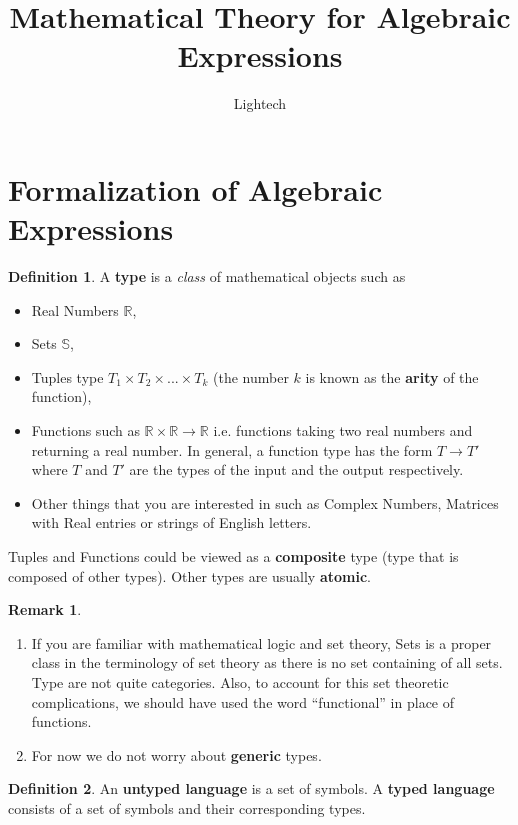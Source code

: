 \documentclass{amsart}
\title{Mathematical Theory for Algebraic Expressions}
\author{Lightech}
\theoremstyle{definition}
\newtheorem{defn}{Definition}
\newtheorem*{remark}{Remark}
\newcommand{\term}[1]{\textbf{#1}}
\newcommand{\R}{\mathbb{R}}
\renewcommand{\S}{\mathbb{S}}
\begin{document}
\maketitle

\section{Formalization of Algebraic Expressions}

\begin{defn}
A \term{type} is a \emph{class} of mathematical objects such as
\begin{itemize}
\item Real Numbers $\R$,
\item Sets $\S$,

\item Tuples type $T_1 \times T_2 \times ... \times T_k$ (the number $k$ is known as the \term{arity} of the function),

\item Functions such as $\R \times \R \rightarrow \R$ i.e. functions taking two real numbers and returning a real number. In general, a function type has the form $T \rightarrow T'$ where $T$ and $T'$ are the types of the input and the output respectively.

\item Other things that you are interested in such as Complex Numbers, Matrices with Real entries or strings of English letters.
\end{itemize}

Tuples and Functions could be viewed as a \term{composite} type (type that is composed of other types). Other types are usually \term{atomic}.
\end{defn}

\begin{remark}
\begin{enumerate}
\item If you are familiar with mathematical logic and set theory, Sets is a proper class in the terminology of set theory as there is no set containing of all sets. Type are not quite categories. Also, to account for this set theoretic complications, we should have used the word ``functional'' in place of functions.

\item For now we do not worry about \term{generic} types.
\end{enumerate}
\end{remark}

\begin{defn}
An \term{untyped language} is a set of symbols. A \term{typed language} consists of a set of symbols and their corresponding types.
\end{defn}
\end{document}
